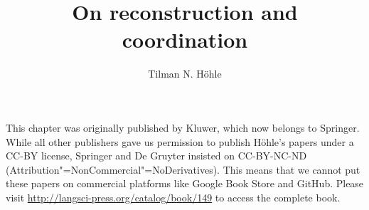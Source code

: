 \documentclass[output=paper]{langsci/langscibook}
\author{Tilman N. Höhle}
\title{On reconstruction and coordination}
\begin{document}
\label{chap-reconstruction}



\noindent
This chapter was originally published by Kluwer, which now belongs to Springer. While all other publishers gave us permission to publish Höhle's papers under a CC-BY
license, Springer and De Gruyter insisted on CC-BY-NC-ND (Attribution"=NonCommercial"=No\-De\-riv\-a\-tives).
This means that we cannot put these papers on commercial platforms like Google Book Store and GitHub. Please
visit \url{http://langsci-press.org/catalog/book/149} to access the complete book.

\pagebreak~
\setcounter{page}{368}
\label{chap-reconstruction-end}
\end{document}
